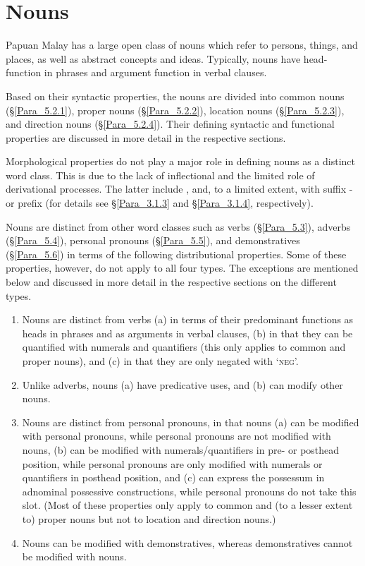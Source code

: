 \section{Nouns}\label{Para_5.2}
\largerpage
Papuan Malay has a large open class of nouns which refer to persons, things, and places, as well as abstract concepts and ideas. Typically, nouns have head-function in  phrases and argument function in verbal clauses.

\largerpage
Based on their syntactic properties, the nouns are divided into common nouns (§\ref{Para_5.2.1}), proper nouns (§\ref{Para_5.2.2}), location nouns (§\ref{Para_5.2.3}), and direction nouns (§\ref{Para_5.2.4}). Their defining syntactic and functional properties are discussed in more detail in the respective sections.



Morphological properties do not play a major role in defining nouns as a distinct word class. This is due to the lack of inflectional  and the limited role of derivational processes. The latter include , and, to a limited extent,  with suffix - or prefix  (for details see §\ref{Para_3.1.3} and §\ref{Para_3.1.4}, respectively).



Nouns are distinct from other word classes such as verbs (§\ref{Para_5.3}), adverbs (§\ref{Para_5.4}), personal pronouns (§\ref{Para_5.5}), and demonstratives (§\ref{Para_5.6}) in terms of the following distributional properties. Some of these properties, however, do not apply to all four  types. The exceptions are mentioned below and discussed in more detail in the respective sections on the different  types.


\begin{enumerate}
\item 
Nouns are distinct from verbs (a) in terms of their predominant functions as heads in  phrases and as arguments in verbal clauses, (b) in that they can be quantified with numerals and quantifiers (this only applies to common and proper nouns), and (c) in that they are only negated with  ‘\textsc{neg}’.
\item 
Unlike adverbs, nouns (a) have predicative uses, and (b) can modify other nouns.
\item 
Nouns are distinct from personal pronouns, in that nouns (a) can be modified with personal pronouns, while personal pronouns are not modified with nouns, (b) can be modified with numerals/quantifiers in pre- or posthead position, while personal pronouns are only modified with numerals or quantifiers in posthead position, and (c) can express the possessum in adnominal possessive constructions, while personal pronouns do not take this slot. (Most of these properties only apply to common and (to a lesser extent to) proper nouns but not to location and direction nouns.)
\item 
Nouns can be modified with demonstratives, whereas demonstratives cannot be modified with nouns.

\end{enumerate}

